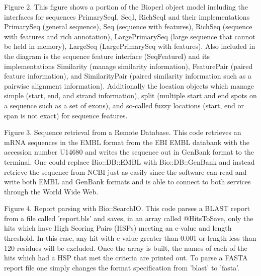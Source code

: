 \documentclass[12pt]{article}
\begin{document}
\newpage


Figure 2. This figure shows a portion of the Bioperl object model
including the interfaces for sequences PrimarySeqI, SeqI, RichSeqI and
their implementations PrimarySeq (general sequence), Seq (sequence
with features), RichSeq (sequence with features and rich
annotation), LargePrimarySeq (large sequence that cannot be held in memory),
LargeSeq (LargePrimarySeq with features).  Also included in the
diagram is the sequence feature interface (SeqFeatureI) and its
implementations Similarity (manage similarity information),
FeaturePair (paired feature information), and SimilarityPair (paired
similarity information such as a pairwise alignment information).
Additionally the location objects which manage simple (start, end, and
strand information), split (multiple start and end spots on a sequence
such as a set of exons), and so-called fuzzy locations (start, end or span
is not exact) for sequence features.

\newpage


Figure 3. Sequence retrieval from a Remote Database.  This code
retrieves an mRNA sequences in the EMBL format from the EBI EMBL
databank with the accession number U14680 and writes the sequence out
in GenBank format to the terminal.  One could replace Bio::DB::EMBL
with Bio::DB::GenBank and instead retrieve the sequence from NCBI just
as easily since the software can read and write both EMBL and GenBank
formats and is able to connect to both services through the World Wide
Web.

\newpage


Figure 4. Report parsing with Bio::SearchIO.  This code parses a BLAST
report from a file called 'report.bls' and saves, in an array called
@HitsToSave, only the hits which have High Scoring Pairs (HSPs)
meeting an e-value and length threshold.  In this case, any hit with
e-value greater than 0.001 or length less than 120 residues will be
excluded.  Once the array is built, the names of each of the hits
which had a HSP that met the criteria are printed out.  To parse a
FASTA \cite{fasta} report file one simply changes the format
specification from 'blast' to 'fasta'.

\newpage

\singlespacing

%
%
\end{document}
